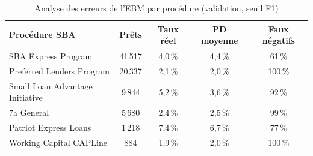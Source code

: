 \begin{table}[htbp]
\centering
\footnotesize\setlength{\tabcolsep}{4pt}
\caption{Analyse des erreurs de l'EBM par procédure (validation, seuil F1)}\label{tab:erreurs}
\begin{tabular}{lcccc}
\toprule
Procédure SBA & Prêts & Taux réel & PD moyenne & Faux négatifs \\
\midrule
SBA Express Program & 41\,517 & 4,0\,\% & 4,4\,\% & 61\,\% \\
Preferred Lenders Program & 20\,337 & 2,1\,\% & 2,0\,\% & 100\,\% \\
Small Loan Advantage Initiative & 9\,844 & 5,2\,\% & 3,6\,\% & 92\,\% \\
7a General & 5\,680 & 2,4\,\% & 2,5\,\% & 99\,\% \\
Patriot Express Loans & 1\,218 & 7,4\,\% & 6,7\,\% & 77\,\% \\
Working Capital CAPLine & 884 & 1,9\,\% & 2,0\,\% & 100\,\% \\
\bottomrule
\end{tabular}
\end{table}
